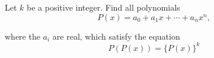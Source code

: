 Let $ k$ be a positive integer. Find all polynomials\[ P(x) = a_0 + a_1 x + \cdots + a_n x^n,\]

where the $ a_i$ are real, which satisfy the equation\[ P(P(x)) = \{ P(x) \}^k\]